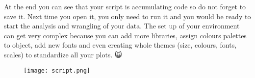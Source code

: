 \documentclass[
  letterpaper,
  DIV=11,
  numbers=noendperiod]{scrartcl}
\begin{document}
At the end you can see that your script is accumulating code so do not
forget to save it. Next time you open it, you only need to run it and
you would be ready to start the analysis and wrangling of your data. The
set up of your environment can get very complex because you can add more
libraries, assign colours palettes to object, add new fonts and even
creating whole themes (size, colours, fonts, scales) to standardize all
your plots. 🙀

\begin{figure}[h]

{\centering \texttt{[image: script.png]}

}

\end{figure}
\end{document}
